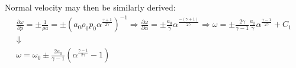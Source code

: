 Normal velocity may then be similarly derived:
\begin{equation}
\label{eq:rarefaction-velocity}
\begin{array}{c}
\frac{{\partial \omega }}{{\partial p}} =  \pm \frac{1}{{\rho a}} =  \pm {\left( {{a_0}{\rho _0}{p_0}{\alpha ^{\frac{{\gamma  + 1}}{{2\gamma }}}}} \right)^{ - 1}} \Rightarrow \frac{{\partial \omega }}{{\partial \alpha }} =  \pm \frac{{{a_0}}}{\gamma }{\alpha ^{\frac{{ - \left( {\gamma  + 1} \right)}}{{2\gamma }}}} \Rightarrow \omega  =  \pm \frac{{2\gamma }}{{\gamma  - 1}}\frac{{{a_0}}}{\gamma }{\alpha ^{\frac{{\gamma  - 1}}{{2\gamma }}}} + {C_1}\\
 \Downarrow \\
\omega  = {\omega _0} \pm \frac{{2{a_0}}}{{\gamma  - 1}}\left( {{\alpha ^{\frac{{\gamma  - 1}}{{2\gamma }}}} - 1} \right)
\end{array}
\end{equation}


